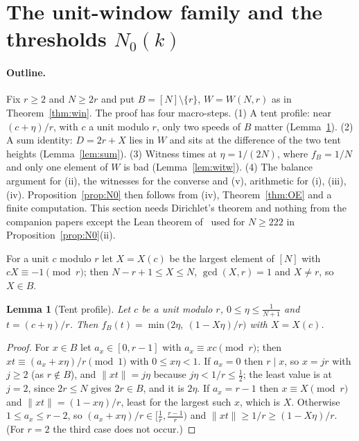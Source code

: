 \documentclass[11pt]{article}
\newtheorem{lemma}[theorem]{Lemma}
\theoremstyle{definition}
\theoremstyle{remark}
\newcommand{\nd}[1]{\lVert #1\rVert}
\begin{document}
\section{The unit-window family and the thresholds $N_0(k)$}\label{sec:win}

\paragraph{Outline.}
Fix $r\ge2$ and $N\ge2r$ and put $B=[N]\setminus\{r\}$, $W=W(N,r)$ as in Theorem~\ref{thm:win}. The proof has four macro-steps. (1) A tent profile: near $(c+\eta)/r$, with $c$ a unit modulo $r$, only two speeds of $B$ matter (Lemma~\ref{lem:tent}). (2) A sum identity: $D=2r+X$ lies in $W$ and sits at the difference of the two tent heights (Lemma~\ref{lem:sum}). (3) Witness times at $\eta=1/(2N)$, where $f_B=1/N$ and only one element of $W$ is bad (Lemma~\ref{lem:witw}). (4) The balance argument for (ii), the witnesses for the converse and (v), arithmetic for (i), (iii), (iv). Proposition~\ref{prop:N0} then follows from (iv), Theorem~\ref{thm:OE} and a finite computation. This section needs Dirichlet's theorem and nothing from the companion papers except the Lean theorem of~\cite{B} used for $N\ge222$ in Proposition~\ref{prop:N0}(ii).

For a unit $c$ modulo $r$ let $X=X(c)$ be the largest element of $[N]$ with $cX\equiv-1\pmod r$; then $N-r+1\le X\le N$, $\gcd(X,r)=1$ and $X\ne r$, so $X\in B$.

\begin{lemma}[Tent profile]\label{lem:tent}
Let $c$ be a unit modulo $r$, $0\le\eta\le\frac1{N+1}$ and $t=(c+\eta)/r$. Then $f_B(t)=\min\bigl(2\eta,\ (1-X\eta)/r\bigr)$ with $X=X(c)$.
\end{lemma}
\begin{proof}
For $x\in B$ let $a_x\in[0,r-1]$ with $a_x\equiv xc\pmod r$; then $xt\equiv(a_x+x\eta)/r\pmod1$ with $0\le x\eta<1$. If $a_x=0$ then $r\mid x$, so $x=jr$ with $j\ge2$ (as $r\notin B$), and $\nd{xt}=j\eta$ because $j\eta<1/r\le\frac12$; the least value is at $j=2$, since $2r\le N$ gives $2r\in B$, and it is $2\eta$. If $a_x=r-1$ then $x\equiv X\pmod r$ and $\nd{xt}=(1-x\eta)/r$, least for the largest such $x$, which is $X$. Otherwise $1\le a_x\le r-2$, so $(a_x+x\eta)/r\in[\frac1r,\frac{r-1}r)$ and $\nd{xt}\ge1/r\ge(1-X\eta)/r$. (For $r=2$ the third case does not occur.)
\end{proof}
\end{document}

